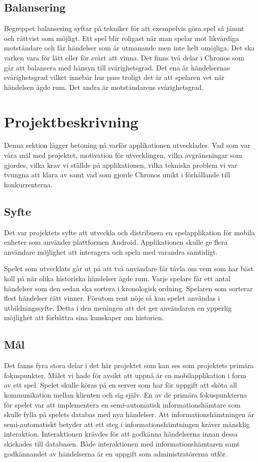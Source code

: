 \documentclass[a4paper, 11pt]{article}
\begin{document}
\subsection{Balansering}
Begreppet balansering syftar på tekniker för att exempelvis göra spel så jämnt och rättvist som möjligt. Ett spel blir roligast när man spelar mot likvärdiga motståndare och får händelser som är utmanande men inte helt omöjliga. Det ska varken vara för lätt eller för svårt att vinna. Det finns två delar i Chronos som går att balansera med hänsyn till svårighetsgrad. Det ena är händelsernas svårighetsgrad vilket innebär hur pass troligt det är att spelaren vet när händelsen ägde rum. Det andra är motståndarens svårighetsgrad.

\section{Projektbeskrivning}
Denna sektion lägger betoning på varför applikationen utvecklades. Vad som var våra mål med projektet, motivation för utvecklingen, vilka avgränsningar som gjordes, vilka krav vi ställde på applikationen, vilka tekniska problem vi var tvungna att klara av samt vad som gjorde Chronos unikt i förhållande till konkurrenterna.

\subsection{Syfte}
Det var projektets syfte att utveckla och distribuera en spelapplikation för mobila enheter som använder plattformen Android. Applikationen skulle ge flera användare möjlighet att interagera och spela med varandra samtidigt.

Spelet som utvecklats går ut på att två användare får tävla om vem som har bäst koll på när olika historiska händelser ägde rum. Varje spelare får ett antal händelser som den sedan ska sortera i kronologisk ordning. Spelaren som sorterar flest händelser rätt vinner. Förutom rent nöje så kan spelet användas i utbildningssyfte. Detta i den meningen att det ger användaren en ypperlig möjlighet att förbättra sina kunskaper om historien.

\subsection{Mål}
Det fanns fyra stora delar i det här projektet som kan ses som projektets primära fokuspunkter. Målet vi hade för avsikt att uppnå är en mobilapplikation i form av ett spel. Spelet skulle köras på en server som har för uppgift att sköta all kommunikation mellan klienten och sig själv. En av de primära fokuspunkterna för spelet var att implementera en semi-automatisk informationshämtare som skulle fylla på spelets databas med nya händelser. Att informationshämtningen är semi-automatiskt betyder att ett steg i informationshämtningen kräver mänsklig interaktion. Interaktionen krävdes för att godkänna händelserna innan dessa skickades till databasen. Både interaktionen med informationshämtaren samt godkännandet av händelserna är en uppgift som administratörerna utför.
\end{document}

